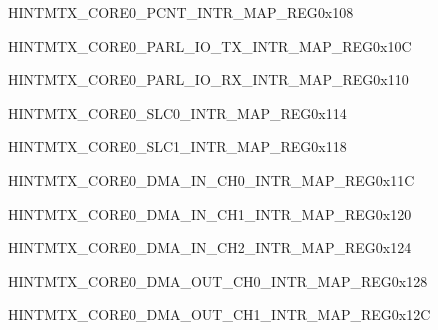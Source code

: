 \begin{register}{H}{INTMTX\_CORE0\_PCNT\_INTR\_MAP\_REG}{0x108}\label{regdesc:INTMTXCORE0PCNTINTRMAPREG} \end{register}\vspace{-3em}
\begin{register}{H}{INTMTX\_CORE0\_PARL\_IO\_TX\_INTR\_MAP\_REG}{0x10C}\label{regdesc:INTMTXCORE0PARLIOTXINTRMAPREG} \end{register}\vspace{-3em}
\begin{register}{H}{INTMTX\_CORE0\_PARL\_IO\_RX\_INTR\_MAP\_REG}{0x110}\label{regdesc:INTMTXCORE0PARLIORXINTRMAPREG} \end{register}\vspace{-3em}
\begin{register}{H}{INTMTX\_CORE0\_SLC0\_INTR\_MAP\_REG}{0x114}\label{regdesc:INTMTXCORE0SLC0INTRMAPREG} \end{register}\vspace{-3em}
\begin{register}{H}{INTMTX\_CORE0\_SLC1\_INTR\_MAP\_REG}{0x118}\label{regdesc:INTMTXCORE0SLC1INTRMAPREG} \end{register}\vspace{-3em}
\begin{register}{H}{INTMTX\_CORE0\_DMA\_IN\_CH0\_INTR\_MAP\_REG}{0x11C}\label{regdesc:INTMTXCORE0DMAINCH0INTRMAPREG} \end{register}\vspace{-3em}
\begin{register}{H}{INTMTX\_CORE0\_DMA\_IN\_CH1\_INTR\_MAP\_REG}{0x120}\label{regdesc:INTMTXCORE0DMAINCH1INTRMAPREG} \end{register}\vspace{-3em}
\begin{register}{H}{INTMTX\_CORE0\_DMA\_IN\_CH2\_INTR\_MAP\_REG}{0x124}\label{regdesc:INTMTXCORE0DMAINCH2INTRMAPREG} \end{register}\vspace{-3em}
\begin{register}{H}{INTMTX\_CORE0\_DMA\_OUT\_CH0\_INTR\_MAP\_REG}{0x128}\label{regdesc:INTMTXCORE0DMAOUTCH0INTRMAPREG} \end{register}\vspace{-3em}
\begin{register}{H}{INTMTX\_CORE0\_DMA\_OUT\_CH1\_INTR\_MAP\_REG}{0x12C}\label{regdesc:INTMTXCORE0DMAOUTCH1INTRMAPREG} \end{register}\vspace{-3em}
